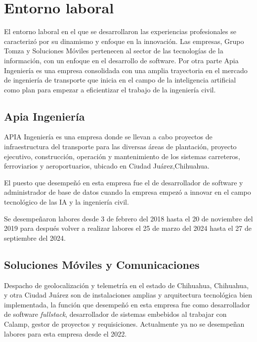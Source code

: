 \documentclass[protocolo.tex]{subfiles}
\begin{document}
\section{Entorno laboral}

El entorno laboral en el que se desarrollaron las experiencias profesionales se caracterizó por su dinamismo y enfoque en la innovación.
Las empresas, Grupo Tomza y Soluciones Móviles pertenecen al sector de las tecnologías de la información, con un enfoque en el desarrollo de software. Por otra parte Apia Ingeniería es una empresa consolidada con una amplia trayectoria en el mercado de ingeniería de transporte que inicia en el campo de la inteligencia artificial como plan para empezar a eficientizar el trabajo de la ingeniería civil.

\subsection{Apia Ingeniería}


APIA Ingeniería es una empresa donde se llevan a cabo proyectos de infraestructura del transporte para las diversas áreas de plantación, proyecto ejecutivo, construcción, operación y mantenimiento de los sistemas carreteros, ferroviarios y aeroportuarios, ubicado en Ciudad Juárez,Chihuahua. \vspace{5mm} 

El puesto que desempeñó en esta empresa fue el de desarrollador de software y administrador de base de datos cuando la empresa empezó a innovar en el campo tecnológico de las IA y la ingeniería civil.

\vspace{5mm} 


Se desempeñaron labores desde 3 de febrero del 2018 hasta el 20 de noviembre del 2019 para después volver a realizar labores el 25 de marzo del 2024 hasta el 27 de septiembre del 2024.

\subsection{Soluciones Móviles y Comunicaciones}
Despacho de geolocalización y telemetría en el estado de Chihuahua, Chihuahua, y otra Ciudad Juárez son de instalaciones amplias y arquitectura tecnológica bien implementada, la función que desempeñó en esta empresa fue como desarrollador de software \textit{fullstack}, desarrollador de sistemas embebidos al trabajar con Calamp, gestor de proyectos y requisiciones. Actualmente ya no se desempeñan labores para esta empresa desde el 2022.\vspace{5mm} 
\end{document}
